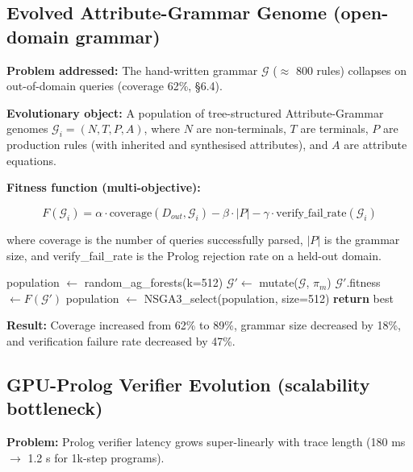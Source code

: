 \documentclass{article}
\begin{document}
\subsection{Evolved Attribute-Grammar Genome (open-domain grammar)}

\textbf{Problem addressed:} The hand-written grammar $\mathcal{G}$ ($\approx$ 800 rules) collapses on out-of-domain queries (coverage 62\%, §6.4).

\textbf{Evolutionary object:} A population of tree-structured Attribute-Grammar genomes $\mathcal{G}_i = (N, T, P, A)$, where $N$ are non-terminals, $T$ are terminals, $P$ are production rules (with inherited and synthesised attributes), and $A$ are attribute equations.

\textbf{Fitness function (multi-objective):}

\begin{equation}
F(\mathcal{G}_i) = \alpha \cdot \text{coverage}(D_{out}, \mathcal{G}_i) - \beta \cdot |P| - \gamma \cdot \text{verify\_fail\_rate}(\mathcal{G}_i)
\end{equation}

where coverage is the number of queries successfully parsed, $|P|$ is the grammar size, and verify\_fail\_rate is the Prolog rejection rate on a held-out domain.

\begin{algorithm}[h]
\caption{EvolvedAttributeGrammarGenome}
\begin{algorithmic}[1]
\STATE population $\leftarrow$ random\_ag\_forests(k=512)
        \STATE $\mathcal{G}' \leftarrow$ mutate($\mathcal{G}$, $\pi_m$)
        \STATE $\mathcal{G}'$.fitness $\leftarrow F(\mathcal{G}')$
    \ENDFOR
    \STATE population $\leftarrow$ NSGA3\_select(population, size=512)
\ENDFOR
\STATE \textbf{return} best
\end{algorithmic}
\end{algorithm}

\textbf{Result:} Coverage increased from 62\% to 89\%, grammar size decreased by 18\%, and verification failure rate decreased by 47\%.

\subsection{GPU-Prolog Verifier Evolution (scalability bottleneck)}

\textbf{Problem:} Prolog verifier latency grows super-linearly with trace length (180 ms $\rightarrow$ 1.2 s for 1k-step programs).
\end{document}
